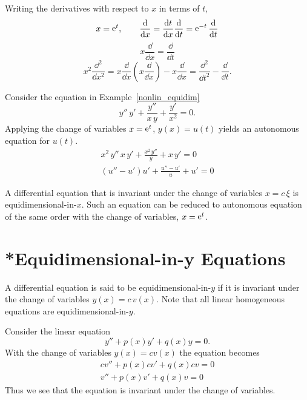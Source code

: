 Writing the derivatives with respect to $x$ in terms of $t$,
\[
x = \mathop{\mathrm{e}}\nolimits^t, \qquad
\frac{\mathrm{d}}{\mathrm{d} x} = \frac{\mathrm{d} t}{\mathrm{d} x} \frac{\mathrm{d}}{\mathrm{d} t} = \mathop{\mathrm{e}}\nolimits^{-t}\frac{\mathrm{d}}{\mathrm{d} t} 
\]
\[
x\frac{\dd}{\dd x} = \frac{\dd}{\dd t}
\]
\[
x^2 \frac{\dd^2}{\dd x^2} = x \frac{\dd}{\dd x} \left(x \frac{\dd}{\dd x}\right) 
- x\frac{\dd}{\dd x} = \frac{\dd^2}{\dd t^2} - \frac{\dd}{\dd t}.
\]


\begin{Example} 
  Consider the equation in Example~\ref{nonlin_equidim} 
  \[ y''\,y' + \frac{y''}{x\,y}+ \frac{y'}{x^2} = 0.\]
  Applying the change of variables $x = \mathop{\mathrm{e}}\nolimits^t$, $y(x) = u(t)$ yields an 
  autonomous equation for $u(t)$.
  \begin{gather*}
    x^2\,y''\,x\,y' + \frac{x^2\,y''}{y} + x\,y' = 0 \\
    \boxed{ (u'' - u') u' + \frac{u'' - u'}{u} + u' = 0  }
  \end{gather*}
\end{Example}







\begin{Result}
  A differential equation that is invariant under the change of variables
  $x = c\,\xi$ is equidimensional-in-$x$.  Such an equation can be reduced
  to autonomous equation of the same order with the change of variables,
  $x = \mathop{\mathrm{e}}\nolimits^t$.
\end{Result}














\section{*Equidimensional-in-y Equations}
A differential equation is said to be equidimensional-in-$y$ if it is invariant
under the change of variables $y(x) = c\,v(x)$.  Note that all linear
homogeneous equations are equidimensional-in-$y$.





\begin{Example} \label{lin_eiy} 
  Consider the linear equation
  \[ y'' + p(x) y' + q(x) y = 0.\]
  With the change of variables $y(x) = c v(x)$ the equation becomes
  \begin{gather*}
    c v'' + p(x)c v' + q(x) c v = 0 \\
    v'' + p(x)v' + q(x) v = 0
  \end{gather*}
  Thus we see that the equation is invariant under the change of variables.
\end{Example}








